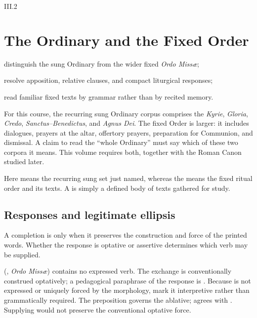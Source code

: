\begin{courseunit}{III.2}
\chapter{The Ordinary and the Fixed Order}

\begin{learningobjectives}
  \item distinguish the sung Ordinary from the wider fixed \emph{Ordo Missæ};
  \item resolve apposition, relative clauses, and compact liturgical responses;
  \item read familiar fixed texts by grammar rather than by recited memory.
\end{learningobjectives}

For this course, the recurring sung Ordinary corpus comprises the
\emph{Kyrie}, \emph{Gloria}, \emph{Credo}, \emph{Sanctus--Benedictus}, and
\emph{Agnus Dei}. The fixed Order is larger: it
includes dialogues, prayers at the altar, offertory prayers, preparation for
Communion, and dismissal. A claim to read the ``whole Ordinary'' must say which
of these two corpora it means. This volume requires both, together with the
Roman Canon studied later.

Here  means the recurring sung set just named, whereas the
 means the fixed ritual order and its texts. A 
is simply a defined body of texts gathered for study.

\section{Responses and legitimate ellipsis}

A completion is  only when it preserves the construction and
force of the printed words. Whether the response is optative or assertive
determines which verb may be supplied.

 (\Missal, \emph{Ordo Missæ})
contains no expressed verb. The exchange is conventionally construed
optatively; a pedagogical paraphrase of the response is . Because  is not expressed or uniquely forced by
the morphology, mark it interpretive rather than grammatically required. The
preposition governs the ablative;  agrees with .
Supplying  would not preserve the conventional optative force.


\end{courseunit}
